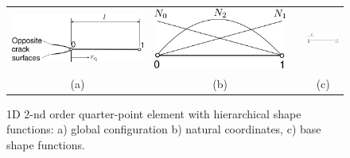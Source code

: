 \documentclass[11pt]{acmeArticle}
\numberwithin{equation}{section}
\begin{document}
\begin{figure}[h!]
\begin{center}
\begin{tabular}{c c c c}
\includegraphics[height=2.cm]{Figures/QuarterPointHierarchical.pdf}  & {\includegraphics[height=2.cm]{Figures/Hierarchical2nd.pdf}} & &\includegraphics[height=1.3cm]{Figures/HierarchicalNaturals.pdf}\\  
 (a) & (b) & & (c)\\  
\end{tabular}
\caption{1D 2-nd order quarter-point element with hierarchical shape functions: a) global configuration b) natural coordinates, c) base shape functions.}
\label{fig:shape_funcs}
\end{center}
\end{figure}
\end{document}
